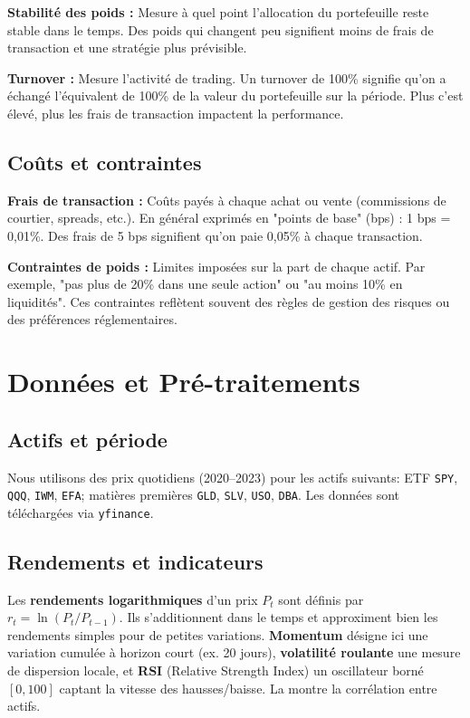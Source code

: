 \documentclass[11pt,a4paper]{article}
\begin{document}
\textbf{Stabilité des poids :} Mesure à quel point l'allocation du portefeuille reste stable dans le temps. Des poids qui changent peu signifient moins de frais de transaction et une stratégie plus prévisible.

\textbf{Turnover :} Mesure l'activité de trading. Un turnover de 100\% signifie qu'on a échangé l'équivalent de 100\% de la valeur du portefeuille sur la période. Plus c'est élevé, plus les frais de transaction impactent la performance.

\subsection{Coûts et contraintes}

\textbf{Frais de transaction :} Coûts payés à chaque achat ou vente (commissions de courtier, spreads, etc.). En général exprimés en "points de base" (bps) : 1 bps = 0,01\%. Des frais de 5 bps signifient qu'on paie 0,05\% à chaque transaction.

\textbf{Contraintes de poids :} Limites imposées sur la part de chaque actif. Par exemple, "pas plus de 20\% dans une seule action" ou "au moins 10\% en liquidités". Ces contraintes reflètent souvent des règles de gestion des risques ou des préférences réglementaires.
\newpage
\section{Données et Pré-traitements}
\subsection{Actifs et période}
Nous utilisons des prix quotidiens (2020--2023) pour les actifs suivants: ETF \texttt{SPY}, \texttt{QQQ}, \texttt{IWM}, \texttt{EFA}; matières premières \texttt{GLD}, \texttt{SLV}, \texttt{USO}, \texttt{DBA}. Les données sont téléchargées via \texttt{yfinance}.

\subsection{Rendements et indicateurs}
Les \textbf{rendements logarithmiques} d'un prix \(P_t\) sont définis par \(r_t = \ln(P_t/P_{t-1})\). Ils s'additionnent dans le temps et approximent bien les rendements simples pour de petites variations.
\textbf{Momentum} désigne ici une variation cumulée à horizon court (ex. 20 jours), \textbf{volatilité roulante} une mesure de dispersion locale, et \textbf{RSI} (Relative Strength Index) un oscillateur borné \([0,100]\) captant la vitesse des hausses/baisse. La  montre la corrélation entre actifs.
\end{document}
